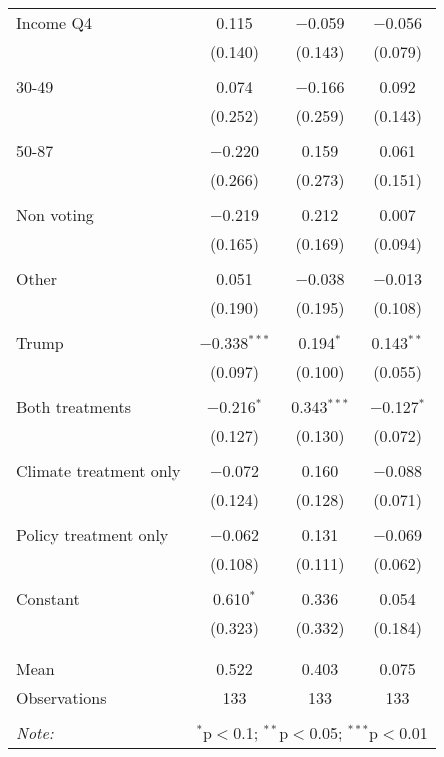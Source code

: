 \begin{tabular}{@{\extracolsep{5pt}}lccc}
 Income Q4 & 0.115 & $-$0.059 & $-$0.056 \\ 
  & (0.140) & (0.143) & (0.079) \\ 
  & & & \\ 
 30-49 & 0.074 & $-$0.166 & 0.092 \\ 
  & (0.252) & (0.259) & (0.143) \\ 
  & & & \\ 
 50-87 & $-$0.220 & 0.159 & 0.061 \\ 
  & (0.266) & (0.273) & (0.151) \\ 
  & & & \\ 
 Non voting & $-$0.219 & 0.212 & 0.007 \\ 
  & (0.165) & (0.169) & (0.094) \\ 
  & & & \\ 
 Other & 0.051 & $-$0.038 & $-$0.013 \\ 
  & (0.190) & (0.195) & (0.108) \\ 
  & & & \\ 
 Trump & $-$0.338$^{***}$ & 0.194$^{*}$ & 0.143$^{**}$ \\ 
  & (0.097) & (0.100) & (0.055) \\ 
  & & & \\ 
 Both treatments & $-$0.216$^{*}$ & 0.343$^{***}$ & $-$0.127$^{*}$ \\ 
  & (0.127) & (0.130) & (0.072) \\ 
  & & & \\ 
 Climate treatment only & $-$0.072 & 0.160 & $-$0.088 \\ 
  & (0.124) & (0.128) & (0.071) \\ 
  & & & \\ 
 Policy treatment only & $-$0.062 & 0.131 & $-$0.069 \\ 
  & (0.108) & (0.111) & (0.062) \\ 
  & & & \\ 
 Constant & 0.610$^{*}$ & 0.336 & 0.054 \\ 
  & (0.323) & (0.332) & (0.184) \\ 
  & & & \\ 
\hline \\[-1.8ex] 
Mean & 0.522 & 0.403 & 0.075 \\ 
Observations & 133 & 133 & 133 \\ 
\hline 
\hline \\[-1.8ex] 
\textit{Note:}  & \multicolumn{3}{r}{$^{*}$p$<$0.1; $^{**}$p$<$0.05; $^{***}$p$<$0.01} \\ 
\end{tabular} 
